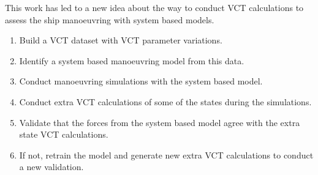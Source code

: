 This work has led to a new idea about the way to conduct VCT calculations to assess the ship manoeuvring with system based models.   
\begin{enumerate}
    \item Build a VCT dataset with VCT parameter variations.
    \item Identify a system based manoeuvring model from this data.
    \item Conduct manoeuvring simulations with the system based model.
    \item Conduct extra VCT calculations of some of the states during the simulations.
    \item Validate that the forces from the system based model agree with the extra state VCT calculations.
    \item If not, retrain the model and generate new extra VCT calculations to conduct a new validation.
\end{enumerate}



